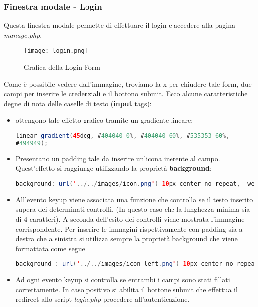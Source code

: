 \subsubsection{Finestra modale - Login}
Questa finestra modale permette di effettuare il login e accedere alla pagina \textit{manage.php}. 
\begin{figure}[h]
	\centering
	\caption{Grafica della Login Form}
	\label{fig:login}
	\texttt{[image: login.png]}
\end{figure} 
Come è possibile vedere dall'immagine, troviamo la x per chiudere tale form, due campi per inserire le credenziali e il bottono submit.
Ecco alcune caratteristiche degne di nota delle caselle di testo (\textbf{input} tags):
\begin{itemize}
\item ottengono tale effetto grafico tramite un gradiente lineare;
\begin{lstlisting}[language=Java]
 linear-gradient(45deg, #404040 0%, #404040 60%, #535353 60%,
#494949);
\end{lstlisting}
\item Presentano un padding tale da inserire un'icona inerente al campo.
Quest'effetto si raggiunge utilizzando la proprietà \textbf{background};
\begin{lstlisting}[language=Java]
background: url('../../images/icon.png') 10px center no-repeat, -webkit-linear-gradient(45deg, #404040 0%, #404040 60%, #535353 60%, #494949);
\end{lstlisting}
\item All'evento keyup viene associata una funzione che controlla se il testo inserito supera dei determinati controlli. (In questo caso che la lunghezza minima sia di 4 caratteri). A seconda dell'esito dei controlli viene mostrata l'immagine corrispondente. Per inserire le immagini rispettivamente con padding sia a destra che a sinistra si utilizza sempre la proprietà background che viene formattata come segue;
\begin{lstlisting}[language=Java]
background : url('../../images/icon_left.png') 10px center no-repeat, url('../../images/icon_right.png')  right 10px no-repeat , linear-gradient(45deg, #404040 0%, #404040 60%, #535353 60%, #494949);
\end{lstlisting}
\item Ad ogni evento keyup si controlla se entrambi i campi sono stati fillati correttamente. In caso positivo si abilita il bottone submit che effettua il redirect allo script \textit{login.php} procedere all'autenticazione.

\end{itemize}

